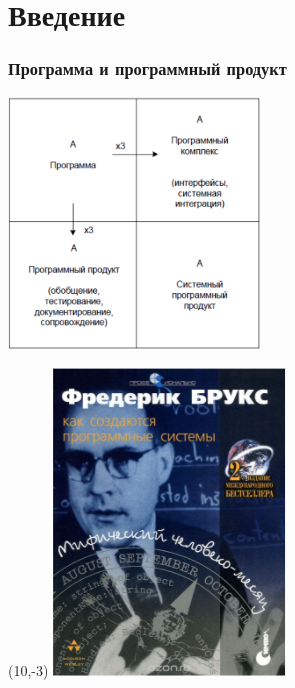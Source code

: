 \documentclass[xetex,mathserif,serif]{beamer}
\begin{document}
    \section{Введение}

    \begin{frame}
        \frametitle{Программа и программный продукт}
        \begin{center}
            \includegraphics[width=0.5\textwidth]{brooksSquare.png}
        \end{center}
        \begin{textblock}{2}(10,-3)
            \includegraphics[width=\textwidth]{brooksCover.png}
        \end{textblock}
    \end{frame}
\end{document}
